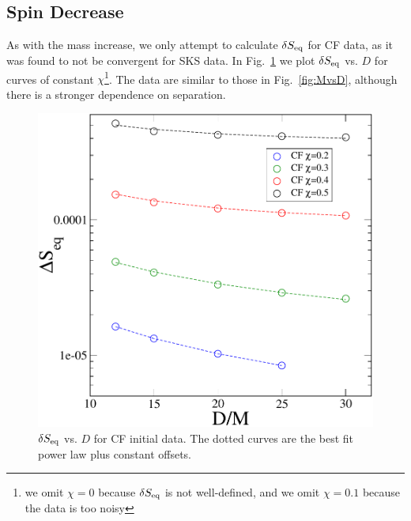 \documentclass[aps,prd,amsmath,floatfix,twocolumn,superscriptaddress,nofootinbib,showpacs]{revtex4-1}
\theoremstyle{plain}
\theoremstyle{definition}
\begin{document}



\subsection{Spin Decrease}
\label{subsec:SpinDecrease}
As with the mass increase, we only attempt to calculate $\delta S_{\rm
  eq}$ for CF data, as it was found to not be convergent for SKS
data. In Fig.~\ref{fig:SvsD} we plot $\delta S_{\rm eq}$ vs. $D$ for
curves of constant $\chi$\footnote{we omit $\chi=0$ because $\delta
  S_{\rm eq}$ is not well-defined, and we omit $\chi=0.1$ because the
  data is too noisy}. The data are similar to those in
Fig.~\ref{fig:MvsD}, although there is a stronger dependence on separation.

\begin{figure}[!htbp]
 \includegraphics[scale=0.50]{SvsD2}
  \caption{$\delta S_{\rm eq}$ vs. $D$ for CF initial data. The dotted
    curves are the best fit power law plus constant offsets.}
  \label{fig:SvsD}
\end{figure}
\end{document}
